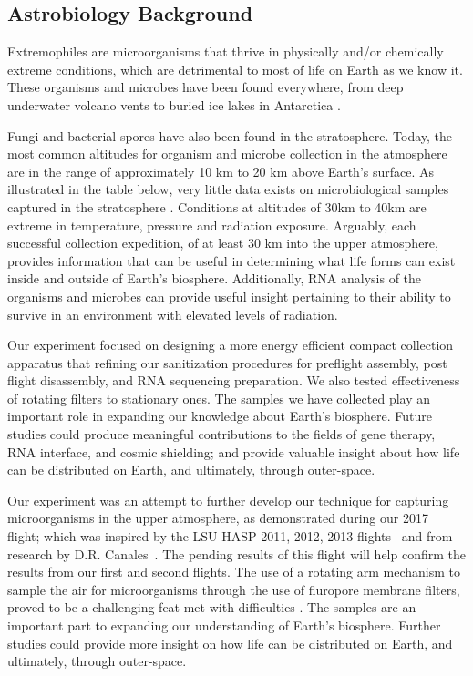 \subsection{Astrobiology Background}
\label{sec:Astrobiology-Background}
Extremophiles are microorganisms that thrive in physically and/or chemically extreme conditions, which are detrimental to most of life on Earth as we know it. These organisms and microbes have been found everywhere, from deep underwater volcano vents to buried ice lakes in Antarctica \cite{Extremophiles}. 

Fungi and bacterial spores have also been found in the stratosphere. Today, the most common altitudes for organism and microbe collection in the atmosphere are in the range of approximately 10 km to 20 km above Earth’s surface. As illustrated in the table below, very little data exists on microbiological samples captured in the stratosphere \cite{Extremophiles}. Conditions at altitudes of 30km to 40km are extreme in temperature, pressure and radiation exposure. Arguably, each successful collection expedition, of at least 30 km into the upper atmosphere, provides information that can be useful in determining what life forms can exist inside and outside of Earth’s biosphere. Additionally, RNA analysis of the organisms and microbes can provide useful insight pertaining to their ability to survive in an environment with elevated levels of radiation.  

Our experiment focused on designing a more energy efficient compact collection apparatus that refining our sanitization procedures for preflight assembly, post flight disassembly, and RNA sequencing preparation. We also tested effectiveness of rotating filters to stationary ones. The samples we have collected play an important role in expanding our knowledge about Earth’s biosphere. Future studies could produce meaningful contributions to the fields of gene therapy, RNA interface, and cosmic shielding; and provide valuable insight about how life can be distributed on Earth, and ultimately, through outer-space.


Our experiment was an attempt to further develop our technique for capturing microorganisms in the upper atmosphere, as demonstrated during our 2017~\cite{SORA1} flight; which was inspired by the LSU HASP 2011, 2012, 2013 flights~\cite{LSU} and from research by D.R. Canales~\cite{Canales}.  The pending results of this flight will help confirm the results from our first and second flights\cite{SORA2}.  The use of a rotating arm mechanism to sample the air for microorganisms through the use of fluropore membrane filters, proved to be a challenging feat met with difficulties . The samples are an important part to expanding our understanding of Earth's biosphere. Further studies could provide more insight on how life can be distributed on Earth, and ultimately, through outer-space.

